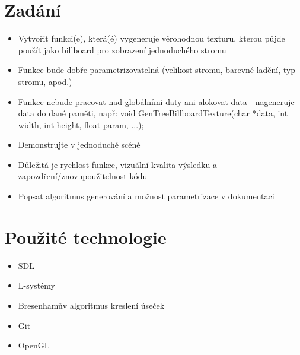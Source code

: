 \documentclass[11pt,a4paper]{article}
\begin{document}
\titlepageandcontents

\section{Zadání}

%

\begin{itemize}
\item Vytvořit funkci(e), která(é) vygeneruje věrohodnou texturu, kterou půjde použít jako billboard pro zobrazení jednoduchého stromu
\item Funkce bude dobře parametrizovatelná (velikost stromu, barevné ladění, typ stromu, apod.)
\item Funkce nebude pracovat nad globálními daty ani alokovat data - nageneruje data do dané paměti, např: void GenTreeBillboardTexture(char *data, int width, int height, float param, ...);
\item Demonstrujte v jednoduché scéně
\item Důležitá je rychlost funkce, vizuální kvalita výsledku a zapozdření/znovupoužitelnost kódu
\item Popsat algoritmus generování a možnost parametrizace v dokumentaci
\end{itemize}

\section{Použité technologie}

%

\begin{itemize}
\item SDL
\item L-systémy
\item Bresenhamův algoritmus kreslení úseček
\item Git
\item OpenGL
\end{itemize}
\end{document}
